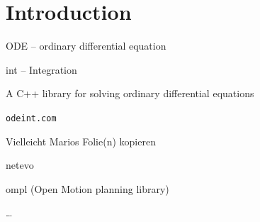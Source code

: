 \section{Introduction}


\begin{frame}

 ODE -- ordinary differential equation

 int -- Integration

 A C++ library for solving ordinary differential equations

 {\tt odeint.com}

\end{frame}

\begin{frame}
 

 Vielleicht Marios Folie(n) kopieren

\end{frame}


\begin{frame}[fragile]
 

netevo

ompl (Open Motion planning library)

\dots

\end{frame}





